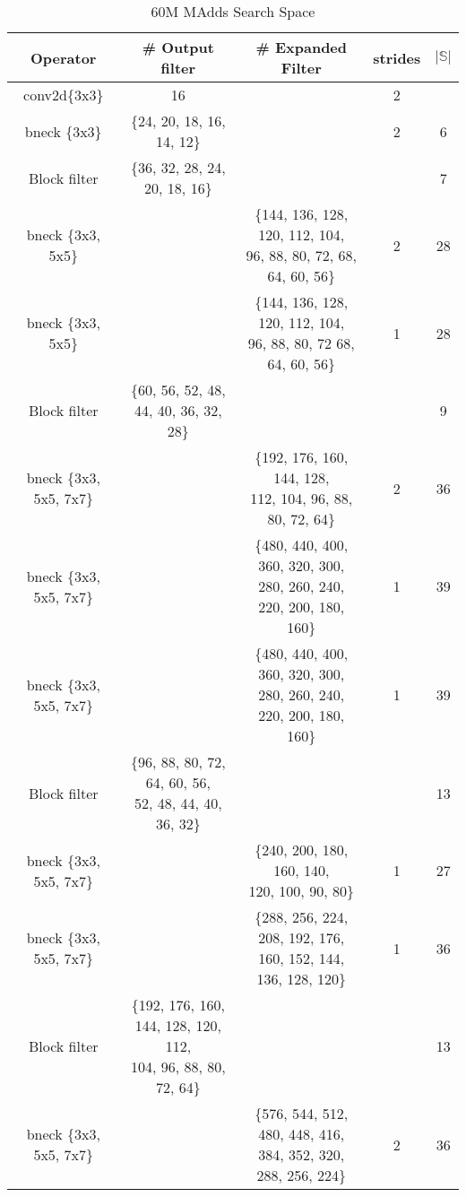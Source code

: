 \begin{table}
\caption{60M MAdds Search Space} 
\begin{center}

\begin{tabular}[hp]{c|c|c|c|c}
\hline
\hline
 Operator  &\# Output filter &\# Expanded Filter &strides &$|\mathbb{S}|$ \\ 
\hline
  conv2d\{3x3\} &16 & &2 \\
\hline
  bneck \{3x3\} & \{24, 20, 18, 16, 14, 12\} & &2 &6\\
\hline
  Block filter &\{36, 32, 28, 24, 20, 18, 16\} & & &7 \\
  bneck \{3x3, 5x5\} & &\shortstack{\{144, 136, 128, 120, 112, 104, \\ 96, 88, 80, 72, 68, 64, 60, 56\}} &2 &28\\
  bneck \{3x3, 5x5\} & &\shortstack{\{144, 136, 128, 120, 112, 104, \\ 96, 88, 80, 72 68, 64, 60, 56\}} &1 &28\\
\hline
Block filter &\{60, 56, 52, 48, 44, 40, 36, 32, 28\} & & &9 \\
  bneck \{3x3, 5x5, 7x7\} & &\shortstack{\{192, 176, 160, 144, 128,\\ 112, 104, 96, 88, 80, 72, 64\}} &2 &36 \\
  bneck \{3x3, 5x5, 7x7\} & &\shortstack{\{480, 440, 400, 360, 320, 300, \\ 280, 260, 240, 220, 200, 180, 160\}} &1 &39\\
  bneck \{3x3, 5x5, 7x7\} & &\shortstack{\{480, 440, 400, 360, 320, 300, \\ 280, 260, 240, 220, 200, 180, 160\}} &1 & 39\\
\hline
Block filter &\shortstack{\{96, 88, 80, 72, 64, 60, 56, \\ 52, 48, 44, 40, 36, 32\}} & & &13 \\
  bneck \{3x3, 5x5, 7x7\} & &\shortstack{\{240, 200, 180, 160, 140,\\ 120, 100, 90, 80\}} &1 &27 \\
  bneck \{3x3, 5x5, 7x7\} & &\shortstack{\{288, 256, 224, 208, 192, 176,\\ 160, 152, 144, 136, 128, 120\}} &1 &36 \\
\hline
Block filter &\shortstack{\{192, 176, 160, 144, 128, 120, 112, \\ 104, 96, 88, 80, 72, 64\}} & & &13 \\
  bneck \{3x3, 5x5, 7x7\} & &\shortstack{\{576, 544, 512, 480, 448, 416, \\ 384, 352, 320, 288, 256, 224\}} &2 &36 \\

\end{tabular}
\end{center}
\end{table}
